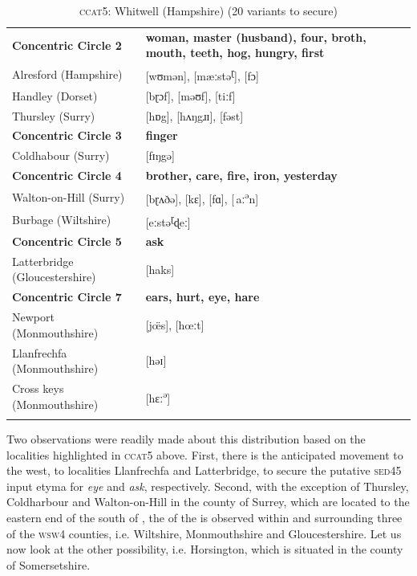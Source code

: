 \begin{table}
\begin{tabularx}{\textwidth}{lQ}
\lsptoprule 
\textbf{Concentric Circle 2} & \textbf{woman, master (husband), four, broth, mouth, teeth, hog, hungry, first} \\  
Alresford (Hampshire) & [wʊmən], [mæːstə\textsuperscript{ɽ}], [fɔ]  \\
Handley (Dorset) & [bɽɔf], [məʊf], [tiːf] \\
Thursley (Surry) & [hɒg], [hʌŋgɹɪ], [fəst] \\
\midrule\textbf{Concentric Circle 3} & \textbf{finger} \\
Coldhabour (Surry) & [fɪŋgə] \\
\midrule\textbf{Concentric Circle 4} & \textbf{brother, care, fire, iron, yesterday}\\
Walton-on-Hill (Surry) & [bɽʌðə], [kɛ], [fɑ], [\,aː\textsuperscript{ə}n] \\
Burbage (Wiltshire) & [eːstə\textsuperscript{ɽ}ɖeː] \\
\midrule\textbf{Concentric Circle 5} & \textbf{ask}\\ 
Latterbridge (Gloucestershire) & [haks] \\
\midrule\textbf{Concentric Circle 7} & \textbf{ears, hurt, eye, hare}\\ 
Newport (Monmouthshire) & [j\"œs], [hœːt] \\
Llanfrechfa (Monmouthshire) & [həɪ]\\
Cross keys (Monmouthshire) & [hɛː\textsuperscript{ə}]\\
\lspbottomrule 
\end{tabularx}
\caption{\textsc{ccat5}: Whitwell (Hampshire)  (20 variants to secure)}
\label{Table 5.6}
\end{table}

Two observations were readily made about this distribution based on the localities highlighted in \textsc{ccat5} above. First, there is the anticipated movement to the west, to localities Llanfrechfa and Latterbridge, to secure the putative \textsc{sed45} input etyma for \emph{eye} and \emph{ask}, respectively. Second, with the exception of Thursley, Coldharbour and Walton-on-Hill in the county of Surrey, which are located to the eastern end of the south of , the  of the  is observed within and surrounding three of the \textsc{wsw4} counties, i.e. Wiltshire, Monmouthshire and Gloucestershire. Let us now look at the other possibility, i.e. Horsington, which is situated in the county of Somersetshire.


